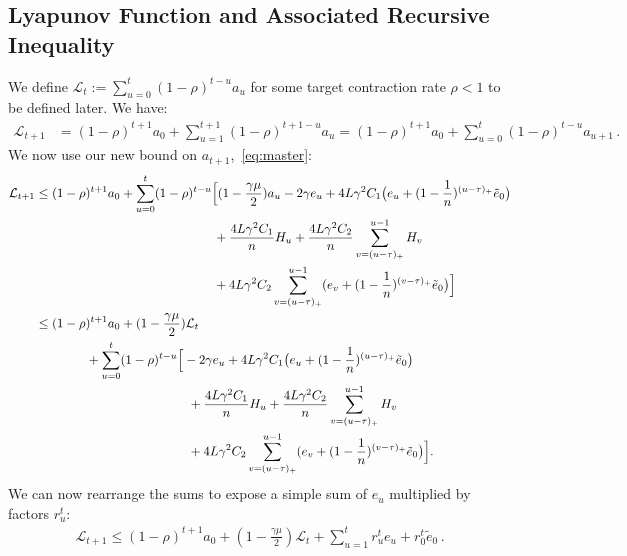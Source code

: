 \documentclass[twoside, 11pt]{article}
\newcommand{\stepsize}{\gamma}
\newcommand{\strongconvex}{\mu}
\newcommand{\overlap}{\tau}
\newcommand{\contraction}{\rho}
\newcommand{\lipschitz}{L}
\newcommand{\lyapunov}{\mathcal{L}}
\begin{document}
\subsection{Lyapunov Function and Associated Recursive Inequality}\label{apxB:lyapunov}
We define $\lyapunov_t := \sum_{u=0}^t (1-\contraction)^{t-u}a_u$ for some target contraction rate $\contraction < 1$ to be defined later.
We have:
\begin{align}
\lyapunov_{t+1}
&= (1 - \contraction)^{t+1}a_0
	+ \sum_{u=1}^{t+1}(1 - \contraction)^{t+1-u}a_u
= (1 - \contraction)^{t+1}a_0
	+ \sum_{u=0}^t(1 - \contraction)^{t-u}a_{u+1} \,  .
\end{align}
We now use our new bound on $a_{t+1}$,~\eqref{eq:master}:
\begin{align}\label{eq:rutMaster}
\lyapunov_{t+1}
&\leq (1 - \contraction)^{t+1}a_0
	+ \sum_{u = 0}^t(1 - \contraction)^{t-u} \Big[
		(1 - \frac{\stepsize\strongconvex}{2}) a_u
		- 2\stepsize e_u
		+ 4\lipschitz\stepsize^2 C_1 \big(e_u  + (1 - \frac{1}{n})^{(u-\overlap)_+} \tilde e_0 \big)
\notag \\
		&\qquad \qquad \qquad \qquad \qquad \qquad \qquad
		+ \frac{4\lipschitz\stepsize^2 C_1}{n} H_u
		+\frac{4\lipschitz\stepsize^2 C_2}{n} \sum_{v=(u-\overlap)_+}^{u-1} H_v
\notag \\
		&\qquad \qquad \qquad \qquad \qquad \qquad \qquad
		+4\lipschitz\stepsize^2 C_2\sum_{v=(u-\overlap)_+}^{u-1} (e_v +  (1 - \frac{1}{n})^{(v - \overlap)_+} \tilde e_0 \big)
	\Big]
\notag \\
&\leq (1 - \contraction)^{t+1}a_0
	+ (1-\frac{\stepsize\strongconvex}{2})\lyapunov_t
\notag \\
	&\qquad \qquad + \sum_{u = 0}^t(1 - \contraction)^{t-u} \Big[
		- 2\stepsize e_u
		+ 4\lipschitz\stepsize^2 C_1 \big(e_u  + (1 - \frac{1}{n})^{(u-\overlap)_+} \tilde e_0 \big)
\notag \\
		&\qquad \qquad \qquad \qquad \qquad \qquad
		+ \frac{4\lipschitz\stepsize^2 C_1}{n} H_u
		+\frac{4\lipschitz\stepsize^2 C_2}{n} \sum_{v=(u-\overlap)_+}^{u-1} H_v
\notag \\
		&\qquad \qquad \qquad \qquad \qquad \qquad
		+4\lipschitz\stepsize^2 C_2\sum_{v=(u-\overlap)_+}^{u-1} (e_v +  (1 - \frac{1}{n})^{(v - \overlap)_+} \tilde e_0 \big)
	\Big] .
\end{align}
We can now rearrange the sums to expose a simple sum of $e_u$ multiplied by factors $r_u^t$:
\begin{align}\label{apx:Lyapunov}
\lyapunov_{t+1} \leq (1 - \contraction)^{t+1}a_0 + (1-\frac{\stepsize\strongconvex}{2})\lyapunov_t + \sum_{u=1}^t r_u^t e_u + r_0^t \tilde e_0  \, .
\end{align}
\end{document}
